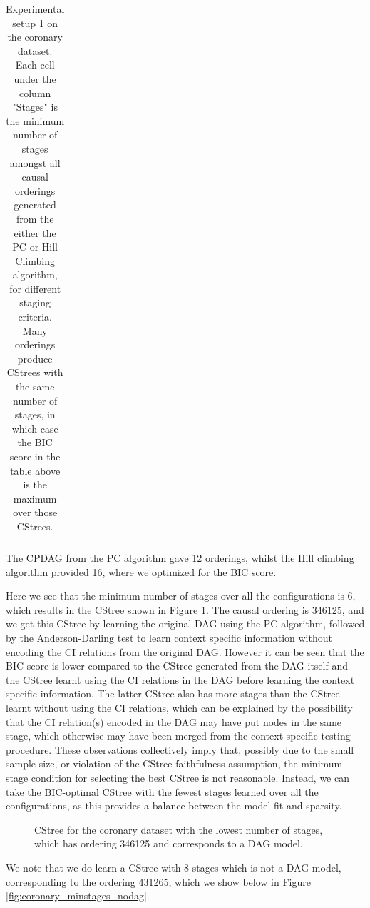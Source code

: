 \documentclass{tufte-book}
\begin{document}
\begin{table}[]
\begin{tabular}{cccccccccccccccc}
\caption{Experimental setup 1 on the coronary dataset. Each cell under the column "Stages" is the minimum number of stages amongst all causal orderings generated from the either the PC or Hill Climbing algorithm, for different staging criteria. Many orderings produce CStrees with the same number of stages, in which case the BIC score in the table above is the maximum over those CStrees.}
\end{tabular}
\end{table}

The CPDAG from the PC algorithm gave 12 orderings, whilst the Hill climbing algorithm provided 16, where we optimized for the BIC score.


Here we see that the minimum number of stages over all the configurations is 6, which results in the CStree shown in Figure \ref{fig:coronary1}. The causal ordering is 346125, and we get this CStree by learning the original DAG using the PC algorithm, followed by the Anderson-Darling test to learn context specific information without encoding the CI relations from the original DAG. However it can be seen that the BIC score is lower compared to the CStree generated from the DAG itself and the CStree learnt using the CI relations in the DAG before learning the context specific information. The latter CStree also has more stages than the CStree learnt without using the CI relations, which can be explained by the possibility that the CI relation(s) encoded in the DAG may have put nodes in the same stage, which otherwise may have been merged from the context specific testing procedure. These observations collectively imply that, possibly due to the small sample size, or violation of the CStree faithfulness assumption, the minimum stage condition for selecting the best CStree is not reasonable. Instead, we can take the BIC-optimal CStree with the fewest stages learned over all the configurations, as this provides a balance between the model fit and sparsity.

\begin{figure}[]\label{fig:coronary1}
   \begin{floatrow}
%
\caption{CStree for the coronary dataset with the lowest number of stages, which has ordering 346125 and corresponds to a DAG model.}
        
   \end{floatrow}
\end{figure}

We note that we do learn a CStree with 8 stages which is not a DAG model, corresponding to the ordering 431265, which we show below in Figure \ref{fig:coronary_minstages_nodag}.
\end{document}
